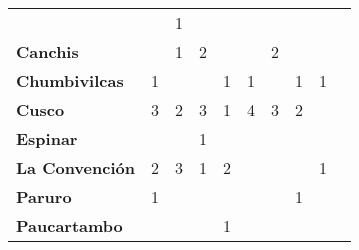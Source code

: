 \begin{tabular}{lccccccccc}
 	& \cellcolor[HTML]{FCC46C}                 &1                                 &\cellcolor[HTML]{FCC46C} 				& \cellcolor[HTML]{FCC46C}                   & \cellcolor[HTML]{FCC46C}\\
	\textbf{Canchis}                           & \cellcolor[HTML]{FCC46C}  
	& 1                 &2                     & \cellcolor[HTML]{FCC46C}                   								& \cellcolor[HTML]{FCC46C}                   &2                  				  & \cellcolor[HTML]{FCC46C}                & \cellcolor[HTML]{FCC46C} 				   & \cellcolor[HTML]{FCC46C} \\
	\textbf{Chumbivilcas}                      &1                 				  & \cellcolor[HTML]{FCC46C}                & \cellcolor[HTML]{FCC46C}                   &1                    &1                                       				& \cellcolor[HTML]{FCC46C}                                         &1           & \multicolumn{1}{l}{1}   				& \cellcolor[HTML]{FCC46C} \\
	\textbf{Cusco}                             &3 				     &2                  &3                    				& 1                                          &4                    &3                  &2                 &\cellcolor[HTML]{FCC46C}    			   & \cellcolor[HTML]{FCC46C} \\
	\textbf{Espinar}       					   & \cellcolor[HTML]{FCC46C}  			   &\cellcolor[HTML]{FCC46C}                  & 1                						   & \cellcolor[HTML]{FCC46C}              &\cellcolor[HTML]{FCC46C}                  & \cellcolor[HTML]{FCC46C}                 &\cellcolor[HTML]{FCC46C}                  & \cellcolor[HTML]{FCC46C}  			   &\cellcolor[HTML]{FCC46C}\\
	\textbf{La Convención}                     &2 				 	&3                                            &1                     					   &2                   &\cellcolor[HTML]{FCC46C}               				& \cellcolor[HTML]{FCC46C}                   &\cellcolor[HTML]{FCC46C}               &1 									& \cellcolor[HTML]{FCC46C}\\
	\textbf{Paruro}                            & 1 					&\cellcolor[HTML]{FCC46C}                     			& \cellcolor[HTML]{FCC46C}              	   &\cellcolor[HTML]{FCC46C}                     								& \cellcolor[HTML]{FCC46C}              	   &\cellcolor[HTML]{FCC46C}                     &1                   				  	   &\cellcolor[HTML]{FCC46C}   													& \cellcolor[HTML]{FCC46C} \\
	\textbf{Paucartambo}               		   &\cellcolor[HTML]{FCC46C}  													& \cellcolor[HTML]{FCC46C}                   & \cellcolor[HTML]{FCC46C}                      & 1                          & \cellcolor[HTML]{FCC46C}                   & \cellcolor[HTML]{FCC46C}                      & \cellcolor[HTML]{FCC46C}                   & \cellcolor[HTML]{FCC46C} 					   & \cellcolor[HTML]{FCC46C}\\

\end{tabular}
